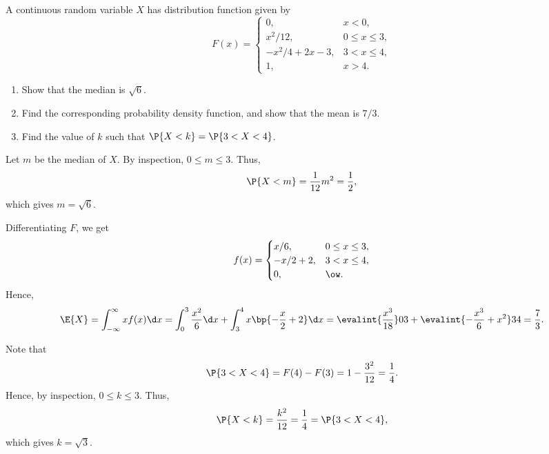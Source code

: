 \begin{problem}
    A continuous random variable $X$ has distribution function given by \[F(x) = \begin{cases}
        0, & x < 0,\\
        x^2/12, & 0 \leq x \leq 3,\\
        -x^2/4 + 2x - 3, & 3 < x \leq 4,\\
        1, & x > 4.
    \end{cases}\]

    \begin{enumerate}
        \item Show that the median is $\sqrt{6}$.
        \item Find the corresponding probability density function, and show that the mean is $7/3$.
        \item Find the value of $k$ such that $\P{X < k} = \P{3 < X < 4}$.
    \end{enumerate}
\end{problem}
\begin{solution}
    \begin{ppart}
        Let $m$ be the median of $X$. By inspection, $0 \leq m \leq 3$. Thus, \[\P{X < m} = \frac1{12} m^2 = \frac12,\] which gives $m = \sqrt{6}$.
    \end{ppart}
    \begin{ppart}
        Differentiating $F$, we get \[f(x) = \begin{cases}
            x/6, & 0 \leq x \leq 3,\\
            -x/2 + 2, & 3 < x \leq 4,\\
            0, & \ow.
        \end{cases}\]
        Hence, \[\E{X} = \int_{-\infty}^{\infty} x f(x) \d x = \int_0^3 \frac{x^2}6 \d x + \int_3^4 x\bp{-\frac{x}{2} + 2} \d x = \evalint{\frac{x^3}{18}}03 + \evalint{-\frac{x^3}6 + x^2}34 = \frac73.\]
    \end{ppart}
    \begin{ppart}
        Note that \[\P{3 < X < 4} = F(4) - F(3) = 1 - \frac{3^2}{12} = \frac14.\] Hence, by inspection, $0 \leq k \leq 3$. Thus, \[\P{X < k} = \frac{k^2}{12} = \frac14 = \P{3 < X < 4},\] which gives $k = \sqrt{3}$.
    \end{ppart}
\end{solution}

